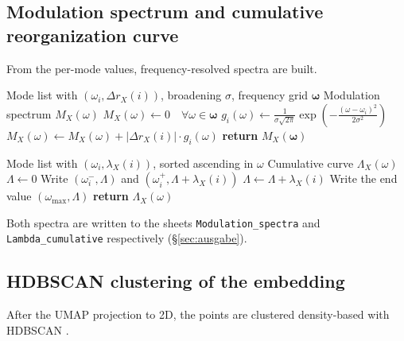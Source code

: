 \documentclass[11pt,a4paper,twoside]{article}
\theoremstyle{remark}
\begin{document}
\subsection{Modulation spectrum and cumulative reorganization curve}
\label{app:pseudo-spektren}

From the per-mode values, frequency-resolved spectra are built.

\begin{algorithm}[H]
\caption{\textsc{ModulationSpectrum}}
\begin{algorithmic}[1]
\Require Mode list with $(\omega_i, \Delta r_X(i))$, broadening $\sigma$,
         frequency grid $\boldsymbol{\omega}$
\Ensure Modulation spectrum $M_X(\omega)$
\State $M_X(\omega) \gets 0 \quad \forall \omega \in \boldsymbol{\omega}$
  \State $g_i(\omega) \gets \frac{1}{\sigma\sqrt{2\pi}}
         \exp\!\left(-\frac{(\omega - \omega_i)^2}{2\sigma^2}\right)$
  \State $M_X(\omega) \gets M_X(\omega) + |\Delta r_X(i)| \cdot g_i(\omega)$
\EndFor
\State \textbf{return} $M_X(\boldsymbol{\omega})$
\end{algorithmic}
\end{algorithm}

\begin{algorithm}[H]
\caption{\textsc{CumulativeReorg}}
\begin{algorithmic}[1]
\Require Mode list with $(\omega_i, \lambda_X(i))$, sorted ascending in $\omega$
\Ensure Cumulative curve $\Lambda_X(\omega)$
\State $\Lambda \gets 0$
  \State Write $(\omega_i^-, \Lambda)$ and $(\omega_i^+, \Lambda + \lambda_X(i))$
  \State $\Lambda \gets \Lambda + \lambda_X(i)$
\EndFor
\State Write the end value $(\omega_\text{max}, \Lambda)$
\State \textbf{return} $\Lambda_X(\omega)$
\end{algorithmic}
\end{algorithm}

Both spectra are written to the sheets
\texttt{Modulation\_spectra} and \texttt{Lambda\_cumulative}
respectively (\S\ref{sec:ausgabe}).

\subsection{HDBSCAN clustering of the embedding}
\label{app:pseudo-hdbscan}

After the UMAP projection to 2D, the points are clustered
density-based with HDBSCAN \cite{Campello2013}.
\end{document}
